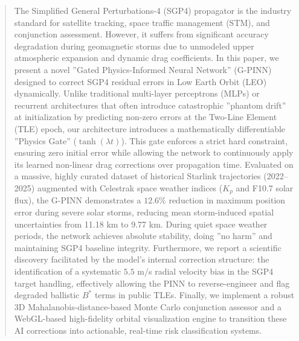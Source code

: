 \begin{abstract}
The Simplified General Perturbations-4 (SGP4) propagator is the industry standard for satellite tracking, space traffic management (STM), and conjunction assessment. However, it suffers from significant accuracy degradation during geomagnetic storms due to unmodeled upper atmospheric expansion and dynamic drag coefficients. In this paper, we present a novel ''Gated Physics-Informed Neural Network'' (G-PINN) designed to correct SGP4 residual errors in Low Earth Orbit (LEO) dynamically. Unlike traditional multi-layer perceptrons (MLPs) or recurrent architectures that often introduce catastrophic ''phantom drift'' at initialization by predicting non-zero errors at the Two-Line Element (TLE) epoch, our architecture introduces a mathematically differentiable ''Physics Gate'' ($\tanh(\lambda t)$). This gate enforces a strict hard constraint, ensuring zero initial error while allowing the network to continuously apply its learned non-linear drag corrections over propagation time. Evaluated on a massive, highly curated dataset of historical Starlink trajectories (2022--2025) augmented with Celestrak space weather indices ($K_p$ and F10.7 solar flux), the G-PINN demonstrates a $12.6\%$ reduction in maximum position error during severe solar storms, reducing mean storm-induced spatial uncertainties from 11.18 km to 9.77 km. During quiet space weather periods, the network achieves absolute stability, doing ''no harm'' and maintaining SGP4 baseline integrity. Furthermore, we report a scientific discovery facilitated by the model's internal correction structure: the identification of a systematic $5.5$ m/s radial velocity bias in the SGP4 target handling, effectively allowing the PINN to reverse-engineer and flag degraded ballistic $B^*$ terms in public TLEs. Finally, we implement a robust 3D Mahalanobis-distance-based Monte Carlo conjunction assessor and a WebGL-based high-fidelity orbital visualization engine to transition these AI corrections into actionable, real-time risk classification systems.
\end{abstract}
